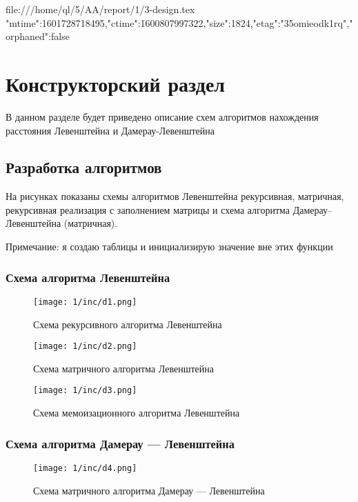 file:///home/ql/5/AA/report/1/3-design.tex {"mtime":1601728718495,"ctime":1600807997322,"size":1824,"etag":"35omieodk1rq","orphaned":false}
\chapter{Конструкторский раздел}
\label{cha:design}

В данном разделе будет приведено описание схем алгоритмов
нахождения расстояния Левенштейна и Дамерау-Левенштейна

\section{Разработка алгоритмов}

На рисунках показаны схемы алгоритмов Левенштейна
рекурсивная, матричная, рекурсивная реализация с заполнением матрицы
и схема алгоритма Дамерау–Левенштейна (матричная).

Примечание: я создаю таблицы и инициализирую значение вне этих функции


\pagebreak
\subsection{Схема алгоритма Левенштейна}

\begin{figure}[h]
    \centering
    \texttt{[image: 1/inc/d1.png]}
    \caption{Схема рекурсивного алгоритма Левенштейна}
\end{figure}

\pagebreak
\begin{figure}[h]
    \centering
    \texttt{[image: 1/inc/d2.png]}
    \caption{Схема матричного алгоритма Левенштейна}
\end{figure}

\pagebreak
\begin{figure}[h]
    \centering
    \texttt{[image: 1/inc/d3.png]}
    \caption{Схема мемоизационного алгоритма Левенштейна}
\end{figure}


\newpage
\subsection{Схема алгоритма Дамерау — Левенштейна}

\begin{figure}[]
    \centering
    \texttt{[image: 1/inc/d4.png]}
    \caption{Схема матричного алгоритма Дамерау — Левенштейна}
\end{figure}